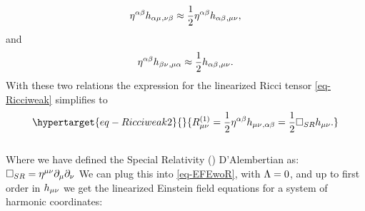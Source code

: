 \documentclass[
  letterpaper,
  DIV=11,
  numbers=noendperiod,
  oneside]{scrreprt}
\begin{document}
\[
    \texttip{\texttip{\eta}{Minkoski metric tensor +---}^{\alpha\beta}}{contravariant Minkoski metric components +---}\texttip{\texttip{h}{weak metric tensor}_{\alpha\mu}}{weak covariant metric tensor component}\texttip{{}_{,\nu\beta}}{Partial derivative} \approx \frac{1}{2}\texttip{\texttip{\eta}{Minkoski metric tensor +---}^{\alpha\beta}}{contravariant Minkoski metric components +---}\texttip{\texttip{h}{weak metric tensor}_{\alpha\beta}}{weak covariant metric tensor component}\texttip{{}_{,\mu\nu}}{Partial derivative},
\] and \[
    \texttip{\texttip{\eta}{Minkoski metric tensor +---}^{\alpha\beta}}{contravariant Minkoski metric components +---}\texttip{\texttip{h}{weak metric tensor}_{\beta\nu}}{weak covariant metric tensor component}\texttip{{}_{,\mu\alpha}}{Partial derivative} \approx \frac{1}{2}\texttip{\texttip{h}{weak metric tensor}_{\alpha\beta}}{weak covariant metric tensor component}\texttip{{}_{,\mu\nu}}{Partial derivative}.
\] With these two relations the expression for the linearized Ricci
tensor \ref{eq-Ricciweak} simplifies to
\begin{equation}\protect\hypertarget{eq-Ricciweak2}{}{
    \texttip{\texttip{R^{(1)}}{linearized Ricci tensor}_{{\mu\nu}}}{covariant linearized Ricci tensor component}= \frac{1}{2}\texttip{\texttip{\eta}{Minkoski metric tensor +---}^{\alpha\beta}}{contravariant Minkoski metric components +---}\texttip{\texttip{h}{weak metric tensor}_{{\mu\nu}}}{weak covariant metric tensor component}\texttip{{}_{,\alpha\beta}}{Partial derivative} = \frac{1}{2}\mathtip{\Box_{SR}}{\texttip{\texttip{\eta}{Minkoski metric tensor +---}^{{\mu\nu}}}{contravariant Minkoski metric components +---}\partial_\mu\partial_\nu}\texttip{\texttip{h}{weak metric tensor}_{{\mu\nu}}}{weak covariant metric tensor component}.
}\label{eq-Ricciweak2}\end{equation}\\
Where we have defined the Special Relativity () D'Alembertian as:
\(\mathtip{\Box_{SR}}{\texttip{\texttip{\eta}{Minkoski metric tensor +---}^{{\mu\nu}}}{contravariant Minkoski metric components +---}\partial_\mu\partial_\nu}=\texttip{\texttip{\eta}{Minkoski metric tensor +---}^{{\mu\nu}}}{contravariant Minkoski metric components +---}\partial_\mu\partial_\nu\)
We can plug this into \ref{eq-EFEwoR}, with
\(\texttip{\Lambda}{cosmological constant}=0\), and up to first order in
\(\texttip{\texttip{h}{weak metric tensor}_{{\mu\nu}}}{weak covariant metric tensor component}\)
we get the linearized Einstein field equations for a system of harmonic
coordinates:
\end{document}
